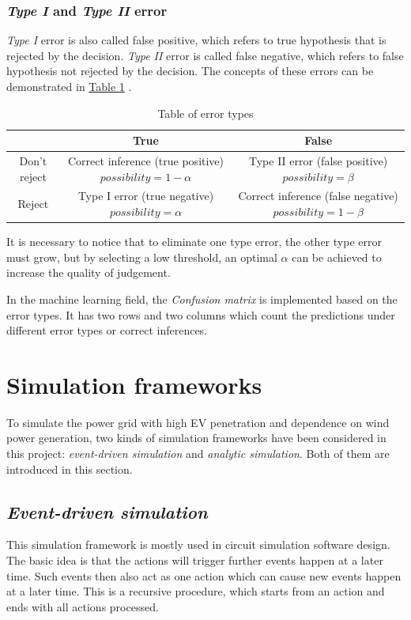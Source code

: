 \documentclass[12pt,a4paper]{report}
\begin{document}
        \subsubsection{\emph{Type I} and \emph{Type II} error}
        \emph{Type I} error is also called false positive, which refers to true hypothesis that is rejected by the decision. \emph{Type II} error is called false negative, which refers to false hypothesis not rejected by the decision. The concepts of these errors can be demonstrated in \hyperref[table_error_types]{Table \ref*{table_error_types}} \cite{website:typeItypeIIerror}.
        \begin{table}[ht]
            \centering
            \begin{tabulary}{\linewidth}{|C |C| C|}
                \hline
                 & True & False \\
                \hline
                Don't reject & Correct inference (true positive) $possibility = 1-\alpha$ & Type II error (false positive) $possibility = \beta$ \\
                \hline
                Reject & Type I error (true negative) $possibility = \alpha$ & Correct inference (false negative) $possibility = 1-\beta$ \\
                \hline
            \end{tabulary}
            \caption{Table of error types}
            \label{table_error_types}
        \end{table}
        
        It is necessary to notice that to eliminate one type error, the other type error must grow, but by selecting a low threshold, an optimal $\alpha$ can be achieved to increase the quality of judgement.

        In the machine learning field, the \emph{Confusion matrix} is implemented based on the error types. It has two rows and two columns which count the predictions under different error types or correct inferences.
        \section{Simulation frameworks}
        To simulate the power grid with high EV penetration and dependence on wind power generation,
        two kinds of simulation frameworks have been considered in this project: \emph{event-driven simulation} and \emph{analytic simulation}.
        Both of them are introduced in this section.

        \subsection{\emph{Event-driven simulation}}
        This simulation framework is mostly used in circuit simulation software design. The basic idea is that the actions will trigger further events happen at a later time. Such events then also act as one action which can cause new events happen at a later time.
        This is a recursive procedure, which starts from an action and ends with all actions processed.
\end{document}
